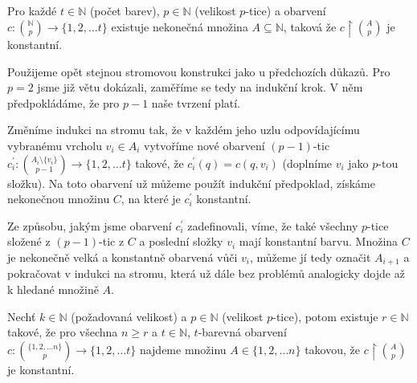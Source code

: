 \begin{t_theorem}
  Pro každé $t\in\mathbb{N}$ (počet barev), $p\in\mathbb{N}$ (velikost $p$-tice) a obarvení $c:\binom{\mathbb{N}}{p}\rightarrow\{1,2,\dots t\}$ existuje nekonečná množina $A\subseteq\mathbb{N}$, taková že $c\restriction\binom{A}{p}$ je konstantní.
\end{t_theorem}

\begin{t_proof}
  Použijeme opět stejnou stromovou konstrukci jako u předchozích důkazů. Pro $p=2$ jsme již větu dokázali, zaměříme se tedy na indukční krok. V něm předpokládáme, že pro $p-1$ naše tvrzení platí.
  
  Změníme indukci na stromu tak, že v každém jeho uzlu odpovídajícímu vybranému vrcholu $v_i\in A_i$ vytvoříme nové obarvení $(p-1)$-tic $c_i^\prime:\binom{A_i\setminus\{v_i\}}{p-1}\rightarrow\{1,2,\dots t\}$ takové, že $c_i^\prime(q)=c(q,v_i)$ (doplníme $v_i$ jako $p$-tou složku). Na toto obarvení už můžeme použít indukční předpoklad, získáme nekonečnou množinu $C$, na které je $c_i^\prime$ konstantní. 
  
  Ze způsobu, jakým jsme obarvení $c_i^\prime$ zadefinovali, víme, že také všechny $p$-tice složené z $(p-1)$-tic z $C$ a poslední složky $v_i$ mají konstantní barvu. Množina $C$ je nekonečně velká a konstantně obarvená vůči $v_i$, můžeme jí tedy označit $A_{i+1}$ a pokračovat v indukci na stromu, která už dále bez problémů analogicky dojde až k hledané množině $A$.
\end{t_proof}

\begin{t_theorem}
  Nechť $k\in\mathbb{N}$ (požadovaná velikost) a $p\in\mathbb{N}$ (velikost $p$-tice), potom existuje $r\in\mathbb{N}$ takové, že pro všechna $n\geq r$ a $t\in\mathbb{N}$, $t$-barevná obarvení $c:\binom{\{1,2,\dots n\}}{p}\rightarrow\{1,2,\dots t\}$ najdeme množinu $A\in\{1,2,\dots n\}$ takovou, že $c\restriction \binom{A}{p}$ je konstantní.
\end{t_theorem}

